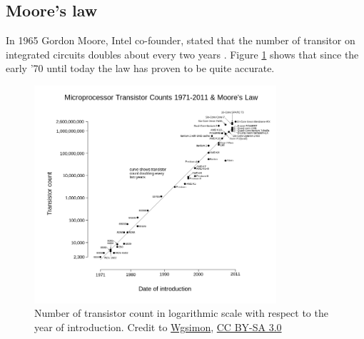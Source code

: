 \subsection{Moore's law}
In 1965 Gordon Moore, Intel co-founder, stated that the number of transitor on integrated circuits doubles about every two years \cite{moore}. Figure \ref{moore} shows that since the early '70 until today the law has proven to be quite accurate.

\begin{figure}
\includegraphics[width=0.8\textwidth]{architectures/moores.png}
\caption{Number of transistor count in logarithmic scale with respect to the year of introduction. Credit to \href{https://commons.wikimedia.org/wiki/User:Wgsimon}{Wgsimon}, \href{http://creativecommons.org/licenses/by-sa/3.0/}{CC BY-SA 3.0}}
\label{moore}
\end{figure}
\clearpage

